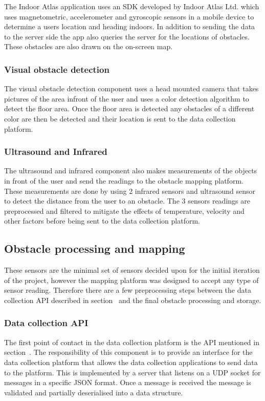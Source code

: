 \documentclass[prodmode,acmtosem]{acmsmall} %
\begin{document}
The Indoor Atlas application uses an SDK developed by Indoor Atlas Ltd. \cite{IndoorAtlas} which uses magnetometric, accelerometer and gyroscopic sensors in a mobile device to determine a users location and heading indoors. In addition to sending the data to the server side the app also queries the server for the locations of obstacles. These obstacles are also drawn on the on-screen map.

\subsubsection{Visual obstacle detection}
The visual obstacle detection component uses a head mounted camera that takes pictures of the area infront of the user and uses a color detection algorithm to detect the floor area. Once the floor area is detected any obstacles of a different color are then be detected and their location is sent to the data collection platform.

\subsubsection{Ultrasound and Infrared}
The ultrasound and infrared component also makes measurements of the objects in front of the user and send the readings to the obstacle mapping platform.
These measurements are done by using 2 infrared sensors and ultrasound sensor to detect the distance from the user to an obstacle. The 3 sensors readings are preprocessed and filtered to mitigate the effects of temperature, velocity and other factors before being sent to the data collection platform. 

\subsection{Obstacle processing and mapping}
These sensors are the minimal set of sensors decided upon for the initial iteration of the project, however the mapping platform was designed to accept any type of sensor reading. Therefore there are a few preprocessing steps between the data collection API described in section~\cite{sec:interactions} and the final obstacle processing and storage.

\subsubsection{Data collection API}
The first point of contact in the data collection platform is the API mentioned in section~\cite{sec:interactions}. The responsibility of this component is to provide an interface for the data collection platform that allows the data collection applications to send data to the platform. This is implemented by a server that listens on a UDP socket for messages in a specific JSON format. Once a message is received the message is validated and partially deserialised into a data structure.
\end{document}
